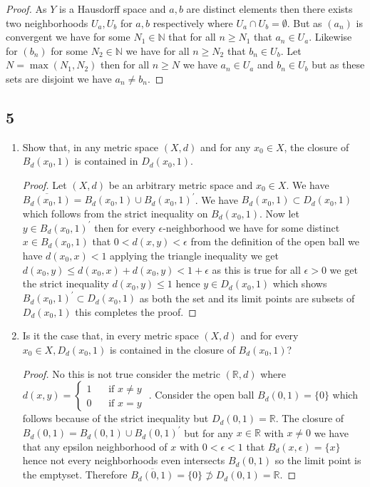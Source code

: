 \documentclass{amsart}
\theoremstyle{plain}
\theoremstyle{definition}
\theoremstyle{remark}
\begin{document}
\begin{proof}
    As $Y$ is a Hausdorff space and $a,b$ are distinct elements then there exists two neighborhoods $U_a,U_b$ for $a,b$ respectively where $U_a\cap U_b=\emptyset$. But as $(a_n)$ is convergent we have for some $N_1\in \mathbb{N}$ that for all $n\geq N_1$ that $a_n\in U_a$. Likewise for $(b_n)$ for some $N_2\in \mathbb{N}$ we have for all $n\geq N_2$ that $b_n\in U_b$. Let $N=\max(N_1,N_2)$ then for all $n\geq N$ we have $a_n\in U_a$ and $b_n\in U_b$ but as these sets are disjoint we have $a_n\not = b_n$. 
\end{proof}

\subsection*{5}
\begin{enumerate}
    \item Show that, in any metric space $(X,d)$ and for any $x_0\in X$, the closure of $B_d(x_0,1)$ is contained in $D_d(x_0,1)$.
    \begin{proof}
        Let $(X,d)$ be an arbitrary metric space and $x_0\in X$. We have $\overline{B_d(x_0,1)}=B_d(x_0,1)\cup B_d(x_0,1)^\prime$. We have $B_d(x_0,1)\subset D_d(x_0,1)$ which follows from the strict inequality on $B_d(x_0,1)$. Now let $y\in B_d(x_0,1)^\prime$ then for every $\epsilon$-neighborhood we have for some distinct $x\in B_d(x_0,1)$ that $0<d(x,y)<\epsilon$ from the definition of the open ball we have $d(x_0,x)<1$ applying the triangle inequality we get $d(x_0,y)\leq d(x_0,x)+d(x_0,y)<1+\epsilon$ as this is true for all $\epsilon >0$ we get the strict inequality $d(x_0,y)\leq 1$ hence $y\in D_d(x_0,1)$ which shows $B_d(x_0,1)^\prime\subset D_d(x_0,1)$ as both the set and its limit points are subsets of $D_d(x_0,1)$ this completes the proof.

    \end{proof}
    \item Is it the case that, in every metric space $(X,d)$ and for every $x_0\in X, D_d(x_0,1)$ is contained in the closure of $B_d(x_0,1)$?
    \begin{proof}
        No this is not true consider the metric $(\mathbb{R},d)$ where $d(x,y)=\begin{cases}
            1 \; & \; \text{ if } x\not = y \\
            0 \; & \; \text { if } x =y
        \end{cases}$
        . Consider the open ball $B_d(0,1)=\{0\}$ which follows because of the strict inequality but $D_d(0,1)=\mathbb{R}$. The closure of $B_d(0,1)=B_d(0,1)\cup B_d(0,1)^\prime$ but for any $x\in \mathbb{R}$ with $x\not = 0 $ we have that any epsilon neighborhood of $x$ with $0<\epsilon<1$ that $B_d(x,\epsilon)=\{x\}$ hence not every neighborhoods even intersects $B_d(0,1)$ so the limit point is the emptyset. Therefore $\overline{B_d(0,1)}=\{0\}\not \supset D_d(0,1)=\mathbb{R}$.
    \end{proof}
\end{enumerate}
\end{document}
